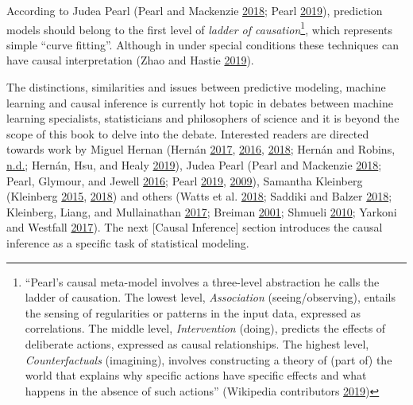 \documentclass[
]{book}
\begin{document}
According to Judea Pearl (Pearl and Mackenzie \protect\hyperlink{ref-pearlBookWhyNew2018}{2018}; Pearl \protect\hyperlink{ref-pearlSevenToolsCausal2019}{2019}), prediction models should belong to the first level of \emph{ladder of causation}\footnote{``Pearl's causal meta-model involves a three-level abstraction he calls the ladder of causation. The lowest level, \emph{Association} (seeing/observing), entails the sensing of regularities or patterns in the input data, expressed as correlations. The middle level, \emph{Intervention} (doing), predicts the effects of deliberate actions, expressed as causal relationships. The highest level, \emph{Counterfactuals} (imagining), involves constructing a theory of (part of) the world that explains why specific actions have specific effects and what happens in the absence of such actions'' (Wikipedia contributors \protect\hyperlink{ref-wiki:xxx}{2019})}, which represents simple ``curve fitting''. Although in under special conditions these techniques can have causal interpretation (Zhao and Hastie \protect\hyperlink{ref-zhaoCausalInterpretationsBlackBox2019}{2019}).

The distinctions, similarities and issues between predictive modeling, machine learning and causal inference is currently hot topic in debates between machine learning specialists, statisticians and philosophers of science and it is beyond the scope of this book to delve into the debate. Interested readers are directed towards work by Miguel Hernan (Hernán \protect\hyperlink{ref-hernanCausalDiagramsDraw2017}{2017}, \protect\hyperlink{ref-hernanDoesWaterKill2016}{2016}, \protect\hyperlink{ref-hernanCWordScientificEuphemisms2018}{2018}; Hernán and Robins, \protect\hyperlink{ref-hernanCausalInference2019}{n.d.}; Hernán, Hsu, and Healy \protect\hyperlink{ref-hernanSecondChanceGet2019}{2019}), Judea Pearl (Pearl and Mackenzie \protect\hyperlink{ref-pearlBookWhyNew2018}{2018}; Pearl, Glymour, and Jewell \protect\hyperlink{ref-pearlCausalInferenceStatistics2016}{2016}; Pearl \protect\hyperlink{ref-pearlSevenToolsCausal2019}{2019}, \protect\hyperlink{ref-pearlCausalInferenceStatistics2009}{2009}), Samantha Kleinberg (Kleinberg \protect\hyperlink{ref-kleinbergWhyGuideFinding2015}{2015}, \protect\hyperlink{ref-kleinbergCausalityProbabilityTime2018}{2018}) and others (Watts et al. \protect\hyperlink{ref-wattsExplanationPredictionCausality2018}{2018}; Saddiki and Balzer \protect\hyperlink{ref-saddikiPrimerCausalityData2018}{2018}; Kleinberg, Liang, and Mullainathan \protect\hyperlink{ref-kleinbergTheoryPredictiveIt2017}{2017}; Breiman \protect\hyperlink{ref-breimanStatisticalModelingTwo2001}{2001}; Shmueli \protect\hyperlink{ref-shmueliExplainPredict2010}{2010}; Yarkoni and Westfall \protect\hyperlink{ref-yarkoniChoosingPredictionExplanation2017}{2017}). The next {[}Causal Inference{]} section introduces the causal inference as a specific task of statistical modeling.
\end{document}
